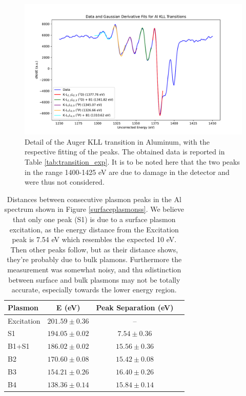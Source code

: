 \documentclass[12pt]{article}
\begin{document}
\begin{figure}[H]
  \includegraphics[scale = 0.49]{alzoom.pdf}
  \caption{Detail of the Auger KLL transition in Aluminum, with the respective fitting of the peaks. The obtained data is reported in Table \ref{tab:transition_exp}. It is to be noted here that the two peaks in the range 1400-1425 eV are due to damage in the detector and were thus not considered.}
  \label{alzoom}
\end{figure}

\begin{table}[H]
    \centering
    \begin{tabular}{lccc}
        \toprule
        \textbf{Plasmon} & \textbf{E (eV)} & \textbf{Peak Separation (eV)} \\
        \midrule
        Excitation  & $201.59 \pm 0.36$ & -- \\
        S1          & $194.05 \pm 0.02$ & $7.54 \pm 0.36$ \\
        B1+S1      & $186.02 \pm 0.02$ & $15.56 \pm 0.36$ \\
        B2          & $170.60 \pm 0.08$ & $15.42 \pm 0.08$ \\
        B3          & $154.21 \pm 0.26$ & $16.40 \pm 0.26$ \\
        B4          & $138.36 \pm 0.14$ & $15.84 \pm 0.14$ \\
        \bottomrule
    \end{tabular}
    \caption{Distances between consecutive plasmon peaks in the Al spectrum shown in Figure \ref{surfaceplasmonss}. We believe that only one peak (S1) is due to a surface plasmon excitation, as the energy distance from the Excitation peak is 7.54 eV which resembles the expected 10 eV. Then other peaks follow, but as their distance shows, they're probably due to bulk plamons. Furthermore the measurement was somewhat noisy, and thu sdistinction between surface and bulk plasmons may not be totally accurate, especially towards the lower energy region.}
    \label{tab:mu_distances2}
\end{table}
\end{document}

